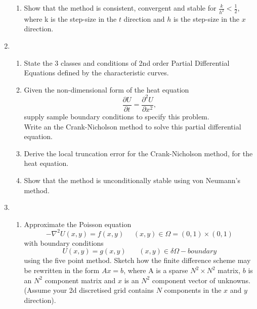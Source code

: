 \begin{enumerate}
\begin{enumerate}
		\item
		Show that the method is consistent, convergent and stable for $\frac{k}{h^2}<\frac{1}{2}$, where k is the step-size in the $t$ direction and $h$ is the step-size
		in the $x$ direction.
		
					
	\end{enumerate}
	\item
		\begin{enumerate}
		\item
		State the 3 classes and conditions of 2nd order Partial Differential Equations defined by the characteristic curves.
		\item
		Given the non-dimensional form of the heat equation
		\[\frac{\partial U}{\partial t} = \frac{\partial^2 U}{\partial x^2},\]
		supply sample boundary conditions to specify this problem.\\
		Write an the Crank-Nicholson method to solve this partial differential equation.
		\item
		Derive the local truncation error for the Crank-Nicholson method, for the heat equation.\\
						
		\item
		Show that the method is unconditionally stable using von Neumann's method.
		
			
	\end{enumerate}
	\item
	\begin{enumerate}
		\item
		Approximate the Poisson equation 
		\[ -\nabla^2U(x,y)=f(x,y) \ \ \ \ \ \ (x,y) \in \Omega=(0,1)\times (0,1) \]
		with boundary conditions
		\[U(x,y) = g(x,y) \ \ \ \ \ \ \ \  (x,y)\in\delta\Omega-boundary \]
		using the five point method.  Sketch how the finite difference scheme may be 
		rewritten in the form $Ax=b$, where A is a sparse
		$N^2\times N^2$ matrix, $b$ is an $N^2$ component matrix and $x$ is an $N^2$
		component vector of unknowns.
		(Assume your 2d discretised grid contains $N$ components in the $x$ and $y$ direction).
		

\end{enumerate}
\end{enumerate}
